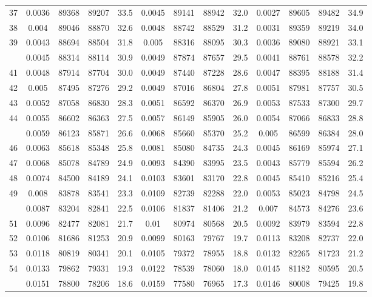 \documentclass[
  14pt,
]{article}
\begin{document}
\begin{longtable}[t]{lcccccccccccc}
37 & 0.0036 & 89368 & 89207 & 33.5 & 0.0045 & 89141 & 88942 & 32.0 & 0.0027 & 89605 & 89482 & 34.9\\
38 & 0.004 & 89046 & 88870 & 32.6 & 0.0048 & 88742 & 88529 & 31.2 & 0.0031 & 89359 & 89219 & 34.0\\
39 & 0.0043 & 88694 & 88504 & 31.8 & 0.005 & 88316 & 88095 & 30.3 & 0.0036 & 89080 & 88921 & 33.1\\
\addlinespace
40 & 0.0045 & 88314 & 88114 & 30.9 & 0.0049 & 87874 & 87657 & 29.5 & 0.0041 & 88761 & 88578 & 32.2\\
41 & 0.0048 & 87914 & 87704 & 30.0 & 0.0049 & 87440 & 87228 & 28.6 & 0.0047 & 88395 & 88188 & 31.4\\
42 & 0.005 & 87495 & 87276 & 29.2 & 0.0049 & 87016 & 86804 & 27.8 & 0.0051 & 87981 & 87757 & 30.5\\
43 & 0.0052 & 87058 & 86830 & 28.3 & 0.0051 & 86592 & 86370 & 26.9 & 0.0053 & 87533 & 87300 & 29.7\\
44 & 0.0055 & 86602 & 86363 & 27.5 & 0.0057 & 86149 & 85905 & 26.0 & 0.0054 & 87066 & 86833 & 28.8\\
\addlinespace
45 & 0.0059 & 86123 & 85871 & 26.6 & 0.0068 & 85660 & 85370 & 25.2 & 0.005 & 86599 & 86384 & 28.0\\
46 & 0.0063 & 85618 & 85348 & 25.8 & 0.0081 & 85080 & 84735 & 24.3 & 0.0045 & 86169 & 85974 & 27.1\\
47 & 0.0068 & 85078 & 84789 & 24.9 & 0.0093 & 84390 & 83995 & 23.5 & 0.0043 & 85779 & 85594 & 26.2\\
48 & 0.0074 & 84500 & 84189 & 24.1 & 0.0103 & 83601 & 83170 & 22.8 & 0.0045 & 85410 & 85216 & 25.4\\
49 & 0.008 & 83878 & 83541 & 23.3 & 0.0109 & 82739 & 82288 & 22.0 & 0.0053 & 85023 & 84798 & 24.5\\
\addlinespace
50 & 0.0087 & 83204 & 82841 & 22.5 & 0.0106 & 81837 & 81406 & 21.2 & 0.007 & 84573 & 84276 & 23.6\\
51 & 0.0096 & 82477 & 82081 & 21.7 & 0.01 & 80974 & 80568 & 20.5 & 0.0092 & 83979 & 83594 & 22.8\\
52 & 0.0106 & 81686 & 81253 & 20.9 & 0.0099 & 80163 & 79767 & 19.7 & 0.0113 & 83208 & 82737 & 22.0\\
53 & 0.0118 & 80819 & 80341 & 20.1 & 0.0105 & 79372 & 78955 & 18.8 & 0.0132 & 82265 & 81723 & 21.2\\
54 & 0.0133 & 79862 & 79331 & 19.3 & 0.0122 & 78539 & 78060 & 18.0 & 0.0145 & 81182 & 80595 & 20.5\\
\addlinespace
55 & 0.0151 & 78800 & 78206 & 18.6 & 0.0159 & 77580 & 76965 & 17.3 & 0.0146 & 80008 & 79425 & 19.8\\

\end{longtable}
\end{document}
